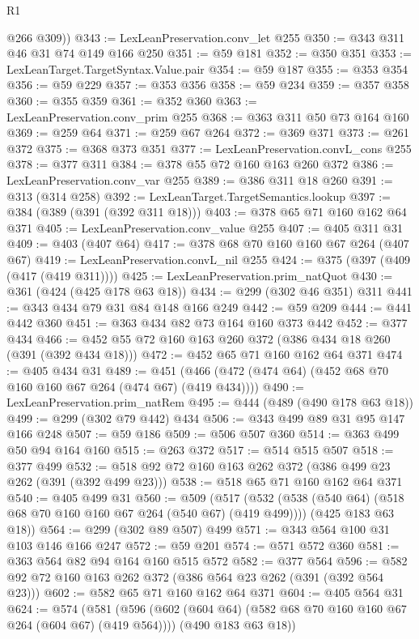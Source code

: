 \begin{lexlean}{R1}
\begin{coremodule}
        @266
        @309))
@343 := LexLeanPreservation.conv_let @255
@350 := @343 @311 @46 @31 @74 @149 @166 @250
@351 := @59 @181
@352 := @350 @351
@353 := LexLeanTarget.TargetSyntax.Value.pair
@354 := @59 @187
@355 := @353 @354
@356 := @59 @229
@357 := @353 @356
@358 := @59 @234
@359 := @357 @358
@360 := @355 @359
@361 := @352 @360
@363 := LexLeanPreservation.conv_prim @255
@368 := @363 @311 @50 @73 @164 @160
@369 := @259 @64
@371 := @259 @67 @264
@372 := @369 @371
@373 := @261 @372
@375 := @368 @373 @351
@377 := LexLeanPreservation.convL_cons @255
@378 := @377 @311
@384 := @378 @55 @72 @160 @163 @260 @372
@386 := LexLeanPreservation.conv_var @255
@389 := @386 @311 @18 @260
@391 := @313 (@314 @258)
@392 := LexLeanTarget.TargetSemantics.lookup
@397 := @384 (@389 (@391 (@392 @311 @18)))
@403 := @378 @65 @71 @160 @162 @64 @371
@405 := LexLeanPreservation.conv_value @255
@407 := @405 @311 @31
@409 := @403 (@407 @64)
@417 := @378 @68 @70 @160 @160 @67 @264 (@407 @67)
@419 := LexLeanPreservation.convL_nil @255
@424 := @375 (@397 (@409 (@417 (@419 @311))))
@425 := LexLeanPreservation.prim_natQuot
@430 := @361 (@424 (@425 @178 @63 @18))
@434 := @299 (@302 @46 @351) @311
@441 := @343 @434 @79 @31 @84 @148 @166 @249
@442 := @59 @209
@444 := @441 @442 @360
@451 := @363 @434 @82 @73 @164 @160 @373 @442
@452 := @377 @434
@466 := @452 @55 @72 @160 @163 @260 @372 (@386 @434 @18 @260 (@391 (@392 @434 @18)))
@472 := @452 @65 @71 @160 @162 @64 @371
@474 := @405 @434 @31
@489 := @451 (@466 (@472 (@474 @64) (@452 @68 @70 @160 @160 @67 @264 (@474 @67) (@419 @434))))
@490 := LexLeanPreservation.prim_natRem
@495 := @444 (@489 (@490 @178 @63 @18))
@499 := @299 (@302 @79 @442) @434
@506 := @343 @499 @89 @31 @95 @147 @166 @248
@507 := @59 @186
@509 := @506 @507 @360
@514 := @363 @499 @50 @94 @164 @160
@515 := @263 @372
@517 := @514 @515 @507
@518 := @377 @499
@532 := @518 @92 @72 @160 @163 @262 @372 (@386 @499 @23 @262 (@391 (@392 @499 @23)))
@538 := @518 @65 @71 @160 @162 @64 @371
@540 := @405 @499 @31
@560 := @509
    (@517
      (@532 (@538 (@540 @64) (@518 @68 @70 @160 @160 @67 @264 (@540 @67) (@419 @499))))
      (@425 @183 @63 @18))
@564 := @299 (@302 @89 @507) @499
@571 := @343 @564 @100 @31 @103 @146 @166 @247
@572 := @59 @201
@574 := @571 @572 @360
@581 := @363 @564 @82 @94 @164 @160 @515 @572
@582 := @377 @564
@596 := @582 @92 @72 @160 @163 @262 @372 (@386 @564 @23 @262 (@391 (@392 @564 @23)))
@602 := @582 @65 @71 @160 @162 @64 @371
@604 := @405 @564 @31
@624 := @574
    (@581
      (@596 (@602 (@604 @64) (@582 @68 @70 @160 @160 @67 @264 (@604 @67) (@419 @564))))
      (@490 @183 @63 @18))

\end{coremodule}
\end{lexlean}
